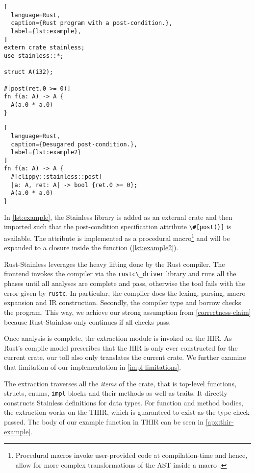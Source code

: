 \noindent\begin{minipage}[b]{.45\textwidth}
\begin{lstlisting}[
  language=Rust,
  caption={Rust program with a post-condition.},
  label={lst:example},
]
extern crate stainless;
use stainless::*;

struct A(i32);

#[post(ret.0 >= 0)]
fn f(a: A) -> A {
  A(a.0 * a.0)
}
\end{lstlisting}
\end{minipage}\hfill
\begin{minipage}[b]{.52\textwidth}
\begin{lstlisting}[
  language=Rust,
  caption={Desugared post-condition.},
  label={lst:example2}
]
fn f(a: A) -> A {
  #[clippy::stainless::post]
  |a: A, ret: A| -> bool {ret.0 >= 0};
  A(a.0 * a.0)
}
\end{lstlisting}
\end{minipage}

In \autoref{lst:example}, the Stainless library is added as an external crate
and then imported such that the post-condition specification attribute
\passthrough{\lstinline!\#[post()]!} is available. The attribute is implemented
as a procedural macro\footnote{Procedural macros invoke user-provided code at
compilation-time and hence, allow for more complex transformations of the AST
inside a macro \cite[section ``Procedural Macros'']{rustref}.} and will be
expanded to a closure inside the function (\autoref{lst:example2}).

Rust-Stainless leverages the heavy lifting done by the Rust compiler. The
frontend invokes the compiler via the \passthrough{\lstinline!rustc\_driver!}
library and runs all the phases until all analyses are complete and pass,
otherwise the tool fails with the error given by
\passthrough{\lstinline!rustc!}. In particular, the compiler does the lexing,
parsing, macro expansion and IR construction. Secondly, the compiler type and
borrow checks the program. This way, we achieve our strong assumption from
\autoref{correctness-claim} because Rust-Stainless only continues if all checks
pass.

Once analysis is complete, the extraction module is invoked on the HIR.
As Rust's compile model prescribes that the HIR is only ever constructed
for the current crate, our toll also only translates the current crate.
We further examine that limitation of our implementation in \autoref{impl-limitations}.

The extraction traverses all the \emph{items} of the crate, that is top-level
functions, structs, enums, \passthrough{\lstinline!impl!} blocks and their
methods as well as traits. It directly constructs Stainless definitions for data
types. For function and method bodies, the extraction works on the THIR, which
is guaranteed to exist as the type check passed. The body of our example
function in THIR can be seen in \autoref{apx:thir-example}.

